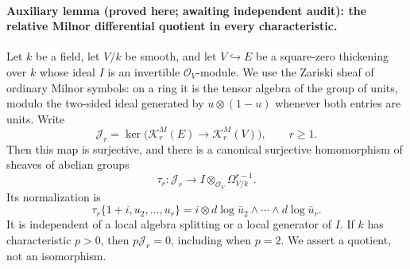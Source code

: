 \paragraph{Auxiliary lemma (proved here; awaiting independent audit):
the relative Milnor differential quotient in every characteristic.}
Let $k$ be a field, let $V/k$ be smooth, and let $V\hookrightarrow E$
be a square-zero thickening over $k$ whose ideal $I$ is an invertible
$\mathcal O_V$-module. We use the Zariski sheaf of ordinary Milnor
symbols: on a ring it is the tensor algebra of the group of units,
modulo the two-sided ideal generated by $u\otimes(1-u)$ whenever
both entries are units. Write
\[
 \mathcal J_r=\ker\bigl(\mathcal K_r^M(E)\longrightarrow
                              \mathcal K_r^M(V)\bigr),\qquad r\geq1.
\]
Then this map is surjective, and there is a canonical surjective
homomorphism of sheaves of abelian groups
\[
 \tau_r:\mathcal J_r\longrightarrow
                     I\otimes_{\mathcal O_V}\Omega^{r-1}_{V/k}.
 \tag{RM.1}
\]
Its normalization is
\[
 \tau_r\{1+i,u_2,\ldots,u_r\}
       =i\otimes d\log\bar u_2\wedge\cdots\wedge d\log\bar u_r.
 \tag{RM.2}
\]
It is independent of a local algebra splitting or a local generator
of $I$. If $k$ has characteristic $p>0$, then $p\mathcal J_r=0$,
including when $p=2$. We assert a quotient, not an isomorphism.

